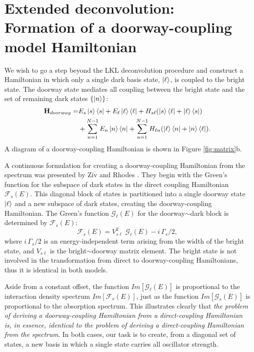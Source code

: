 \documentclass[12pt]{mitthesis}
\begin{document}
\section{Extended deconvolution: \\
  Formation of a doorway-coupling model Hamiltonian}

We wish to go a step beyond the LKL deconvolution procedure and
construct a Hamiltonian in which only a single dark basis state,
$\mathinner{|{\ell}\rangle}$, is coupled to the bright state.  The doorway state
mediates all coupling between the bright state and the set of
remaining dark states $\lbrace \mathinner{|{n}\rangle} \rbrace$:
\begin{equation}
  \begin{split}
    \mathbf{H}_{doorway} =&
    E_s\mathinner{|{s}\rangle}\mathinner{\langle{s}|}
    + E_{\ell}\mathinner{|{\ell}\rangle}\mathinner{\langle{\ell}|}
    + H_{s\ell} ( \mathinner{|{s}\rangle}\mathinner{\langle{\ell}|} + \mathinner{|{\ell}\rangle}\mathinner{\langle{s}|} ) \\
    & + \sum_{n=1}^{N-1} E_n\mathinner{|{n}\rangle}\mathinner{\langle{n}|}
    + \sum_{n=1}^{N-1} H_{\ell n} (\mathinner{|{\ell}\rangle}\mathinner{\langle{n}|} + \mathinner{|{n}\rangle}\mathinner{\langle{\ell}|}).
  \end{split}
\end{equation}
A diagram of a doorway-coupling Hamiltonian is shown in Figure
\ref{fig:matrix}b.

A continuous formulation for creating a doorway-coupling Hamiltonian
from the spectrum was presented by Ziv and Rhodes \cite{ziv76}.  They
begin with the Green's function for the subspace of dark states in the
direct coupling Hamiltonian $\mathcal{F}_s(E)$.  This diagonal block
of states is partitioned into a single doorway state $\mathinner{|{\ell}\rangle}$ and
a new subspace of dark states, creating the doorway-coupling
Hamiltonian.  The Green's function $\mathcal{G}_{\ell}(E)$ for the
doorway$\sim$dark block is determined by $\mathcal{F}_s(E)$:
\begin{equation}
  \label{eq:green-doorway}
  \mathcal{F}_s(E) = V_{s\ell}^2 \; \mathcal{G}_{\ell}(E) - i \, \Gamma_s / 2,
\end{equation}
where $i \, \Gamma_s / 2$ is an energy-independent term arising from
the width of the bright state, and $V_{s\ell}$ is the
bright$\sim$doorway matrix element.  The bright state is not
involved in the transformation from direct to doorway-coupling
Hamiltonians, thus it is identical in both models. 

Aside from a constant offset, the function $Im[\mathcal{G}_{\ell}(E)]$
is proportional to the interaction density spectrum
$Im[\mathcal{F}_s(E)]$, just as the function $Im[\mathcal{G}_s(E)]$ is
proportional to the absorption spectrum.  This illustrates clearly
that \emph{the problem of deriving a doorway-coupling Hamiltonian from
  a direct-coupling Hamiltonian is, in essence, identical to the
  problem of deriving a direct-coupling Hamiltonian from the
  spectrum}.  In both cases, our task is to create, from a diagonal
set of states, a new basis in which a single state carries all
oscillator strength.
\end{document}
